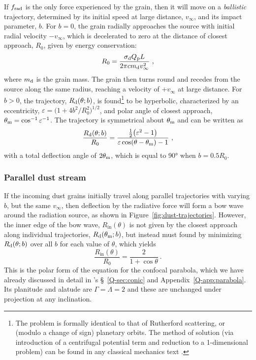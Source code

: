 If \(f_{\text{rad}}\) is the only force experienced by the grain, then it will
move on a \textit{ballistic} trajectory, determined by its initial
speed at large distance, \(v_\infty\), and its impact parameter, \(b\).
For \(b = 0\), the grain radially approaches the source with initial
radial velocity \(-v_\infty\), which is decelerated to zero at the distance
of closest approach, \(R_0\), given by energy conservation:
\begin{equation}
  \label{eq:dust-r0}
  R_0 = \frac{\sigma_{\text{d}} Q_{\text{p}} L} {2 \pi c m_{\text{d}} v_\infty^2} \ ,
\end{equation}
where \(m_{\text{d}}\) is the grain mass.  The grain then turns round and
recedes from the source along the same radius, reaching a velocity of
\(+v_\infty\) at large distance.  For \(b > 0\), the trajectory,
\(R_{\text{d}}(\theta; b)\), is found\footnote{%
  The problem is formally identical to that of Rutherford scattering,
  or (modulo a change of sign) planetary orbits.  The method of
  solution (via introduction of a centrifugal potential term and
  reduction to a 1-dimensional problem) can be found in any classical
  mechanics text \citep[e.g.,][\S~14]{Landau:1976a}.} %
to be hyperbolic, characterized by an eccentricity,
\(\varepsilon = \bigl( 1 + 4 b^2 / R_0^2\bigr)^{1/2}\), and polar angle of
closest approach, \(\theta_{\text{m}} = \cos^{-1} \varepsilon^{-1}\).  The trajectory is
symmetrical about \(\theta_{\text{m}}\) and can be written as
\begin{equation}
  \label{eq:dust-r-theta}
  \frac{R_{\text{d}}(\theta; b)} {R_0} = 
  \frac{ \tfrac12 \bigl( \varepsilon^2 - 1 \bigr)} {\varepsilon \cos(\theta - \theta_{\text{m}}) - 1} \ , 
\end{equation}
with a total deflection angle of \(2 \theta_{\text{m}}\), which is equal to
\ang{90} when \(b = 0.5 R_0\).

\subsubsection{Parallel dust stream}
\label{sec:dust-parallel}

If the incoming dust grains initially travel along parallel
trajectories with varying \(b\), but the same \(v_\infty\), then deflection
by the radiative force will form a bow wave around the radiation
source, as shown in Figure~\ref{fig:dust-trajectories}.  However, the
inner edge of the bow wave, \(R_{\text{in}}(\theta)\) is not given by the
closest approach along individual trajectories, \(R_{\text{d}}(\theta_{\text{m}}; b)\),
but instead must found by minimizing \(R_{\text{d}}(\theta; b)\) over all
\(b\) for each value of \(\theta\), which yields
\begin{equation}
  \label{eq:dust-r-in}
  \frac{R_{\text{in}}(\theta)} {R_0} = \frac{2}{1 + \cos\theta} \ .
\end{equation}
This is the polar form of the equation for the confocal parabola,
which we have already discussed in detail in \PaperI{}'s
\S~\ref{Q-sec:conic} and Appendix~\ref{Q-app:parabola}.  Its planitude
and alatude are \(\Gamma = \Lambda = 2\) and these are unchanged under projection
at any inclination.



